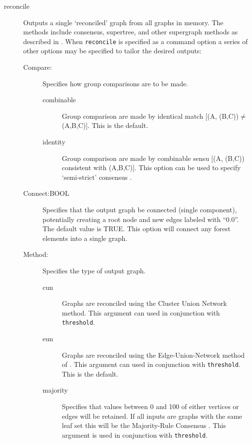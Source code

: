 \begin{description}
		\item[reconcile] Outputs a single `reconciled' graph from all graphs in 
		memory. The methods include consensus, supertree, and other supergraph 
		methods as described in \cite{Wheeler2012, Wheeler2022}. When \texttt{reconcile} 
		is specified as a command option a series of other options may be specified 
		to tailor the desired outputs:
		
		\begin{description}
			\item [Compare:] Specifies how group comparisons are to be made.
						
			\begin{description}
				\item[combinable] Group comparison are made by identical match 
				[(A, (B,C))$\neq$(A,B,C)]. This is the default.	
								
				\item[identity] Group comparison are made by combinable sensu \cite{Nelson1979}
				 [(A, (B,C)) consistent with (A,B,C)]. This option can be used to specify `semi-strict' 
				 consensus \citep{Bremer1990}.
			\end{description}
			
			\item [Connect:BOOL] Specifies that the output graph be connected 
			(single component), potentially creating a root node and new edges labeled 
			with ``0.0''. The default value is TRUE. This option will connect any forest elements
			into a single graph.
			
			\item [Method:] Specifies the type of output graph. 
			
			\begin{description}
				\item[cun] Graphs are reconciled using the Cluster Union Network 
				\citep{Baroni2005} method. This argument can used in conjunction with 
				\texttt{threshold}. 
				
				\item[eun] Graphs are reconciled using the Edge-Union-Network method of 
				\citep{MiyagiandWheeler2019}. This argument can used in conjunction with 
				\texttt{threshold}. This is the default.
				
				\item[majority] Specifies that values between 0 and 100 of either vertices or 
				edges will be retained. If all inputs are graphs with the same leaf set this will 
				be the Majority-Rule Consensus \citep{MargushandMcMorris1981}. This
				argument is used in conjunction with \texttt{threshold}.


\end{description}
\end{description}
\end{description}
